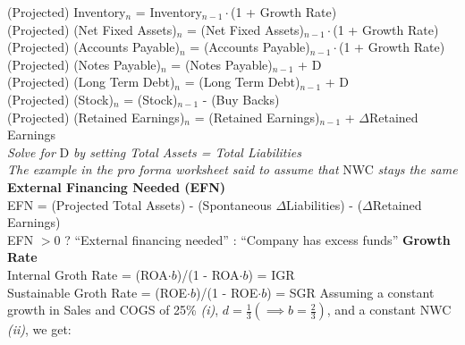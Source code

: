 \documentclass{letter}
\begin{document}
(Projected) Inventory$_n$ = Inventory$_{n - 1} \cdot$(1 + Growth Rate) \\
(Projected) (Net Fixed Assets)$_n$ = (Net Fixed Assets)$_{n - 1} \cdot$(1 + Growth Rate) \\
(Projected) (Accounts Payable)$_n$ = (Accounts Payable)$_{n - 1} \cdot$(1 + Growth Rate) \\
(Projected) (Notes Payable)$_n$ = (Notes Payable)$_{n - 1}$ + D \\
(Projected) (Long Term Debt)$_n$ = (Long Term Debt)$_{n - 1}$ + D \\
(Projected) (Stock)$_n$ = (Stock)$_{n - 1}$ - (Buy Backs) \\
(Projected) (Retained Earnings)$_n$ = (Retained Earnings)$_{n - 1}$ + $\Delta$Retained Earnings \\
\textit{Solve for} D \textit{by setting Total Assets = Total Liabilities} \\
\textit{The example in the pro forma worksheet said to assume that} NWC \textit{stays the same}
\newline
\textbf{External Financing Needed (EFN)} \\
EFN = (Projected Total Assets) - (Spontaneous $\Delta$Liabilities) - ($\Delta$Retained Earnings) \\
EFN $> 0$ ? ``External financing needed'' : ``Company has excess funds''
\newline
\textbf{Growth Rate} \\
Internal Groth Rate = (ROA$\cdot b$)/(1 - ROA$\cdot b$) = IGR \\
Sustainable Groth Rate = (ROE$\cdot b$)/(1 - ROE$\cdot b$) = SGR
\newline
Assuming a constant growth in Sales and COGS of 25\% \textit{(i)}, 
$d = \frac{1}{3} (\implies b = \frac{2}{3})$, 
and a constant NWC \textit{(ii)}, we get:
\newline
\end{document}

